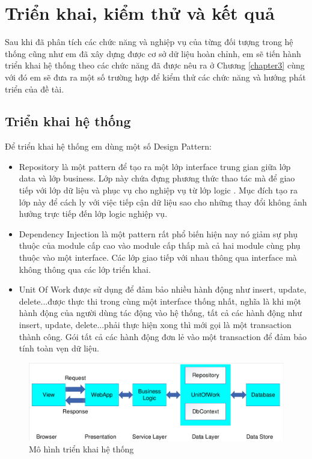 \chapter{Triển khai, kiểm thử và kết quả}
\label{chapter4}
Sau khi đã phân tích các chức năng và nghiệp vụ của từng đối tượng trong hệ thống cũng như em đã xây dựng được cơ sở dữ liệu hoàn chỉnh, em sẽ tiến hành triển khai hệ thống theo các chức năng đã được nêu ra ở Chương \ref{chapter3} cùng với đó em sẽ đưa ra một số trường hợp để kiểm thử các chức năng và hướng phát triển của đề tài.
\section{Triển khai hệ thống}
Để triển khai hệ thống em dùng một số Design Pattern:
\begin{itemize}
\item Repository là một pattern để tạo ra một lớp interface trung gian giữa lớp data và lớp business. Lớp này chứa đựng phương thức thao tác mà để giao tiếp với lớp dữ liệu và phục vụ cho nghiệp vụ từ lớp logic . Mục đích tạo ra lớp này để cách ly với việc tiếp cận dữ liệu sao cho những thay đổi không ảnh hưởng trực tiếp đến lớp logic nghiệp vụ.
\item Dependency Injection là một pattern rất phổ biến hiện nay nó giảm sự phụ thuộc của module cấp cao vào module cấp thấp mà cả hai module cùng phụ thuộc vào một interface. Các lớp giao tiếp với nhau thông qua interface mà không thông qua các lớp triển khai.
\item Unit Of Work được sử dụng để đảm bảo nhiều hành động như insert, update, delete...được thực thi trong cùng một interface thống nhất, nghĩa là khi một hành động của người dùng tác động vào hệ thống, tất cả các hành động như insert, update, delete...phải thực hiện xong thì mới gọi là một transaction thành công. Gói tất cả các hành động đơn lẻ vào một transaction để đảm bảo tính toàn vẹn dữ liệu.	
\end{itemize}
\begin{center}
    \begin{figure}[h]
    \begin{center}
     \includegraphics[scale=0.6]{image/MohinhDuongDiDuLieu.pdf}
    \end{center}
    \caption{Mô hình triển khai hệ thống}
    \label{refhinh4_1}
    \end{figure}
\end{center}

